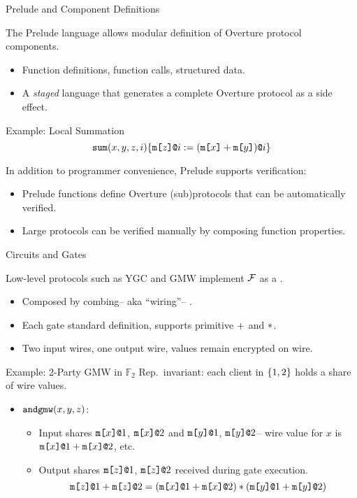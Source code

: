 \documentclass{beamer}
\begin{document}
\begin{frame}{Prelude and Component Definitions}

  The Prelude language allows modular definition of Overture protocol components.
  \begin{itemize}
  \item Function definitions, function calls, structured data.
  \item A \emph{staged} language that generates a complete Overture protocol
    as a side effect.
  \end{itemize}
  
  \begin{exampleblock}{Example: Local Summation}
    $$
    \texttt{sum}(x,y,z,i) \{ \texttt{m[}z\texttt{]}\texttt{@}i := (\texttt{m[}x\texttt{]} + \texttt{m[}y\texttt{]})\texttt{@}i \} 
    $$
  \end{exampleblock}

  In addition to programmer convenience, Prelude supports verification:
  \begin{itemize}
  \item Prelude functions define Overture (sub)protocols that can be automatically verified.
  \item Large protocols can be verified manually by composing function properties. 
  \end{itemize}

\end{frame}

\begin{frame}{Circuits and Gates}

  Low-level protocols such as YGC and GMW implement $\mathcal{F}$ as a .
  \begin{itemize}
  \item Composed by combing-- aka ``wiring''-- .
  \item Each gate standard definition, supports primitive $+$ and $*$.
  \item Two input wires, one output wire, values remain encrypted on wire. 
  \end{itemize}

  \begin{exampleblock}{Example: 2-Party GMW in $\mathbb{F}_2$}
    Rep.~invariant: each client in $\{ 1,2 \}$ holds a share of wire values.
    \begin{itemize}
    \item $\texttt{andgmw}(x,y,z)$:
      \begin{itemize}
      \item Input shares $\texttt{m[}x\texttt{]}\texttt{@}1$, $\texttt{m[}x\texttt{]}\texttt{@}2$ and $\texttt{m[}y\texttt{]}\texttt{@}1$, $\texttt{m[}y\texttt{]}\texttt{@}2$--
        wire value for $x$ is $\texttt{m[}x\texttt{]}\texttt{@}1 + \texttt{m[}x\texttt{]}\texttt{@}2$, etc.
      \item Output shares $\texttt{m[}z\texttt{]}\texttt{@}1$, $\texttt{m[}z\texttt{]}\texttt{@}2$ received during gate execution.
        $$
        \texttt{m[}z\texttt{]}\texttt{@}1 + \texttt{m[}z\texttt{]}\texttt{@}2 = (\texttt{m[}x\texttt{]}\texttt{@}1 + \texttt{m[}x\texttt{]}\texttt{@}2) * (\texttt{m[}y\texttt{]}\texttt{@}1 + \texttt{m[}y\texttt{]}\texttt{@}2)
        $$
      \end{itemize}
    \end{itemize}    
  \end{exampleblock}

\end{frame}
\end{document}
